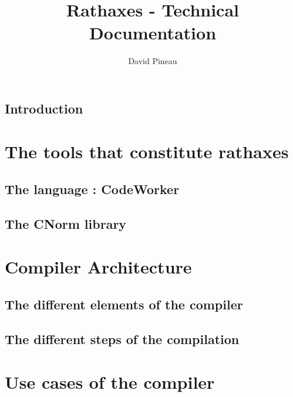 \documentclass{rtxreport}
\author{David Pineau}
\title{Rathaxes - Technical Documentation}
\begin{document}
\maketitle

\rtxmaketitleblock

\tableofcontents



\section*{Introduction}



\chapter{The tools that constitute rathaxes}

\section{The language : CodeWorker}

\section{The CNorm library}



\chapter{Compiler Architecture} %

\section{The different elements of the compiler}

\section{The different steps of the compilation}



\chapter{Use cases of the compiler}
\end{document}
